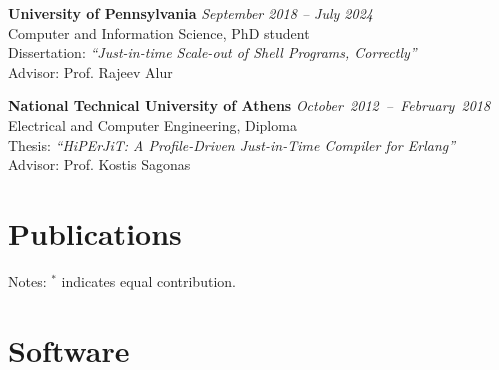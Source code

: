 \documentclass[margin]{res}
\begin{document}
\begin{resume}
\textbf{University of Pennsylvania} \hfill {\em September 2018 -- July 2024}\\
Computer and Information Science, PhD student \\
Dissertation: \textit{``Just-in-time Scale-out of Shell Programs, Correctly''} \\
Advisor: Prof. Rajeev Alur


\textbf{National Technical University of Athens} \hfill \mbox{\em October 2012 -- February 2018}\\
Electrical and Computer Engineering, Diploma \\ %
Thesis: \textit{``HiPErJiT: A Profile-Driven Just-in-Time Compiler for Erlang''} \\
Advisor: Prof. Kostis Sagonas 





\section{Publications}
\hypertarget{sec:publications}{}



Notes: $^*$ indicates equal contribution.

\section{Software}
\hypertarget{sec:software}{}


\end{resume}
\end{document}
